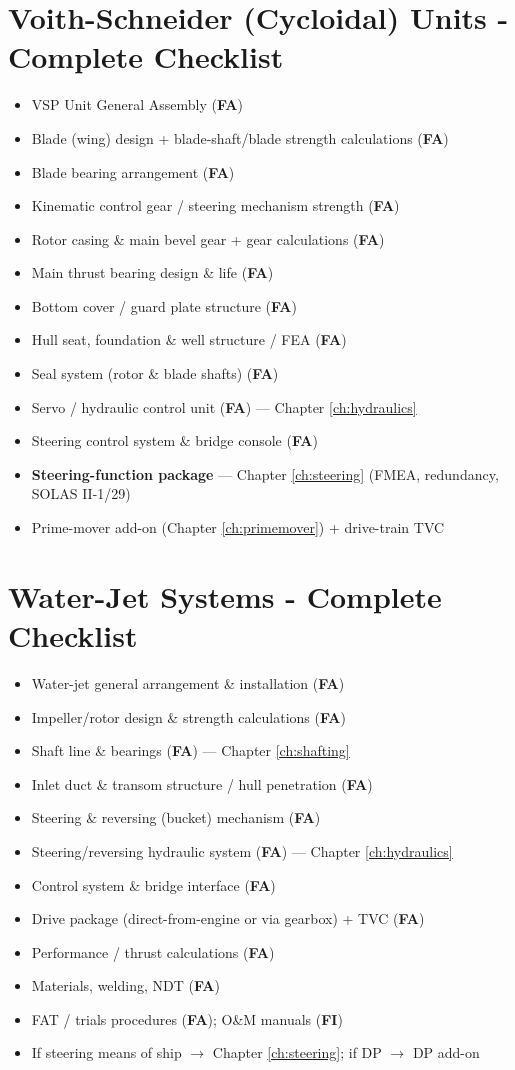 \documentclass[11pt,a4paper]{report}
\newcommand{\fa}{\textbf{\textcolor{warningred}{FA}}}
\newcommand{\fic}{\textbf{\textcolor{bvgray}{FI}}}
\begin{document}
\section{Voith-Schneider (Cycloidal) Units - Complete Checklist}
\begin{itemize}[label=$\square$]
\item VSP Unit General Assembly (\fa{})
\item Blade (wing) design + blade-shaft/blade strength calculations (\fa{})
\item Blade bearing arrangement (\fa{})
\item Kinematic control gear / steering mechanism strength (\fa{})
\item Rotor casing \& main bevel gear + gear calculations (\fa{})
\item Main thrust bearing design \& life (\fa{})
\item Bottom cover / guard plate structure (\fa{})
\item Hull seat, foundation \& well structure / FEA (\fa{})
\item Seal system (rotor \& blade shafts) (\fa{})
\item Servo / hydraulic control unit (\fa{}) --- Chapter \ref{ch:hydraulics}
\item Steering control system \& bridge console (\fa{})
\item \textbf{Steering-function package} --- Chapter \ref{ch:steering} (FMEA, redundancy, SOLAS II-1/29)
\item Prime-mover add-on (Chapter \ref{ch:primemover}) + drive-train TVC
\end{itemize}

\section{Water-Jet Systems - Complete Checklist}
\begin{itemize}[label=$\square$]
\item Water-jet general arrangement \& installation (\fa{})
\item Impeller/rotor design \& strength calculations (\fa{})
\item Shaft line \& bearings (\fa{}) --- Chapter \ref{ch:shafting}
\item Inlet duct \& transom structure / hull penetration (\fa{})
\item Steering \& reversing (bucket) mechanism (\fa{})
\item Steering/reversing hydraulic system (\fa{}) --- Chapter \ref{ch:hydraulics}
\item Control system \& bridge interface (\fa{})
\item Drive package (direct-from-engine or via gearbox) + TVC (\fa{})
\item Performance / thrust calculations (\fa{})
\item Materials, welding, NDT (\fa{})
\item FAT / trials procedures (\fa{}); O\&M manuals (\fic{})
\item If steering means of ship $\rightarrow$ Chapter \ref{ch:steering}; if DP $\rightarrow$ DP add-on
\end{itemize}
\end{document}
